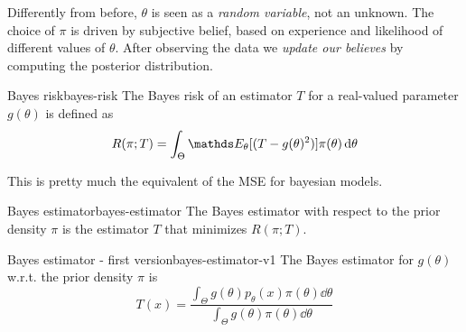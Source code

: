 \documentclass[12pt]{extarticle}
\begin{document}
Differently from before, $\theta$ is seen as a \emph{random variable}, not an unknown.
The choice of $\pi$ is driven by subjective belief, based on experience and likelihood of different values of $\theta$.
After observing the data we \emph{update our believes} by computing the posterior distribution.

\begin{definition}{Bayes risk}{bayes-risk}
	The Bayes risk of an estimator $T$ for a real-valued parameter $g(\theta)$ is defined as
	\begin{equation}
		R(\pi; T) = \int_\Theta \E_\theta[(T-g(\theta)^2)] \pi(\theta) \dd{\theta}
	\end{equation}
\end{definition}
This is pretty much the equivalent of the MSE for bayesian models.

\begin{definition}{Bayes estimator}{bayes-estimator}
	The Bayes estimator with respect to the prior density $\pi$ is the estimator $T$ that minimizes $R(\pi; T)$.
\end{definition}

\begin{theorem}{Bayes estimator - first version}{bayes-estimator-v1}
	The Bayes estimator for $g(\theta)$ w.r.t. the prior density $\pi$ is
	\begin{equation}
		T(x) = \frac{\int_\Theta g(\theta) p_\theta(x)\pi(\theta) \dd{\theta}}{\int_\Theta g(\theta) \pi(\theta) \dd{\theta}}
	\end{equation}
\end{theorem}
\end{document}
